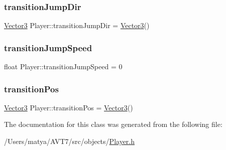 \subsubsection{\texorpdfstring{transition\+Jump\+Dir}{transitionJumpDir}}
{\footnotesize\ttfamily \hyperlink{class_vector3}{Vector3} Player\+::transition\+Jump\+Dir = \hyperlink{class_vector3}{Vector3}()\hspace{0.3cm}{\ttfamily [protected]}}

\mbox{\label{class_player_af7711712d6bd0b3185f8a38f769ff3c8}} 
\subsubsection{\texorpdfstring{transition\+Jump\+Speed}{transitionJumpTime}}
{\footnotesize\ttfamily float Player\+::transition\+Jump\+Speed = 0\hspace{0.3cm}{\ttfamily [protected]}}

\mbox{\label{class_player_a6c51347e4c397febebd559c19d7969b9}} 
\subsubsection{\texorpdfstring{transition\+Pos}{transitionPos}}
{\footnotesize\ttfamily \hyperlink{class_vector3}{Vector3} Player\+::transition\+Pos = \hyperlink{class_vector3}{Vector3}()\hspace{0.3cm}{\ttfamily [protected]}}



The documentation for this class was generated from the following file\+:\begin{DoxyCompactItemize}
\item 
/\+Users/matya/\+A\+V\+T7/src/objects/\hyperlink{_player_8h}{Player.\+h}\end{DoxyCompactItemize}
